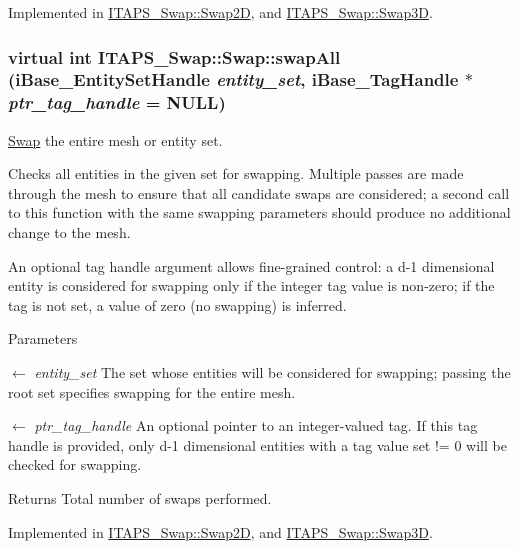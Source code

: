 Implemented in \hyperlink{class_i_t_a_p_s___swap_1_1_swap2_d_a84a78678e5e830d16c725a93f3b5038f}{ITAPS\_\-Swap::Swap2D}, and \hyperlink{class_i_t_a_p_s___swap_1_1_swap3_d_a82a135da16b4ef6e5ff36f8293cc450c}{ITAPS\_\-Swap::Swap3D}.

\hypertarget{class_i_t_a_p_s___swap_1_1_swap_a8a1fdc1a12fb71dfe28881b10277eafc}{
\subsubsection[{swapAll}]{\setlength{\rightskip}{0pt plus 5cm}virtual int ITAPS\_\-Swap::Swap::swapAll (iBase\_\-EntitySetHandle {\em entity\_\-set}, \/  iBase\_\-TagHandle $\ast$ {\em ptr\_\-tag\_\-handle} = {\ttfamily NULL})}}
\label{class_i_t_a_p_s___swap_1_1_swap_a8a1fdc1a12fb71dfe28881b10277eafc}


\hyperlink{class_i_t_a_p_s___swap_1_1_swap}{Swap} the entire mesh or entity set. 

Checks all entities in the given set for swapping. Multiple passes are made through the mesh to ensure that all candidate swaps are considered; a second call to this function with the same swapping parameters should produce no additional change to the mesh.

An optional tag handle argument allows fine-\/grained control: a d-\/1 dimensional entity is considered for swapping only if the integer tag value is non-\/zero; if the tag is not set, a value of zero (no swapping) is inferred.


\begin{DoxyParams}{Parameters}
\item[\mbox{$\leftarrow$} {\em entity\_\-set}]The set whose entities will be considered for swapping; passing the root set specifies swapping for the entire mesh.\item[\mbox{$\leftarrow$} {\em ptr\_\-tag\_\-handle}]An optional pointer to an integer-\/valued tag. If this tag handle is provided, only d-\/1 dimensional entities with a tag value set != 0 will be checked for swapping.\end{DoxyParams}
\begin{DoxyReturn}{Returns}
Total number of swaps performed. 
\end{DoxyReturn}


Implemented in \hyperlink{class_i_t_a_p_s___swap_1_1_swap2_d_a4bee7d3a08e3ff6ac85a81ec321479ef}{ITAPS\_\-Swap::Swap2D}, and \hyperlink{class_i_t_a_p_s___swap_1_1_swap3_d_a139a400102ad7039fcc74d92d72dea27}{ITAPS\_\-Swap::Swap3D}.



